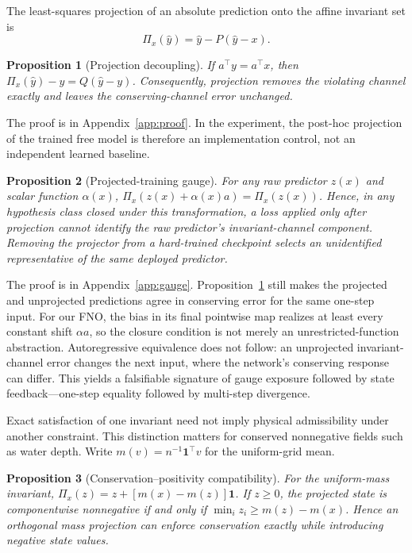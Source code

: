 \documentclass{article}
\newtheorem{proposition}{Proposition}
\begin{document}
The least-squares projection of an absolute prediction onto the affine invariant set is
\begin{equation}
  \Pi_x(\hat y)=\hat y-P(\hat y-x).
\end{equation}

\begin{proposition}[Projection decoupling]
\label{prop:decoupling}
If $a^\top y=a^\top x$, then
$\Pi_x(\hat y)-y=Q(\hat y-y)$. Consequently, projection removes the violating channel exactly and
leaves the conserving-channel error unchanged.
\end{proposition}

The proof is in Appendix~\ref{app:proof}. In the experiment, the post-hoc projection of the trained
free model is therefore an implementation control, not an independent learned baseline.

\begin{proposition}[Projected-training gauge]
\label{prop:gauge}
For any raw predictor $z(x)$ and scalar function $\alpha(x)$,
$\Pi_x(z(x)+\alpha(x)a)=\Pi_x(z(x))$. Hence, in any hypothesis class closed under this
transformation, a loss applied only after projection cannot identify the raw predictor's
invariant-channel component. Removing the projector from a hard-trained checkpoint selects an
unidentified representative of the same deployed predictor.
\end{proposition}

The proof is in Appendix~\ref{app:gauge}. Proposition~\ref{prop:decoupling} still makes the
projected and unprojected predictions agree in conserving error for the same one-step input.
For our FNO, the bias in its final pointwise map realizes at least every constant shift $\alpha a$,
so the closure condition is not merely an unrestricted-function abstraction.
Autoregressive equivalence does not follow: an unprojected invariant-channel error changes the next
input, where the network's conserving response can differ. This yields a falsifiable signature of
gauge exposure followed by state feedback---one-step equality followed by multi-step divergence.

Exact satisfaction of one invariant need not imply physical admissibility under another
constraint. This distinction matters for conserved nonnegative fields such as water depth. Write
$m(v)=n^{-1}\mathbf{1}^{\top}v$ for the uniform-grid mean.

\begin{proposition}[Conservation--positivity compatibility]
\label{prop:positivity}
For the uniform-mass invariant, $\Pi_x(z)=z+[m(x)-m(z)]\mathbf{1}$. If $z\geq0$, the projected
state is componentwise nonnegative if and only if
$\min_i z_i\geq m(z)-m(x)$. Hence an orthogonal mass projection can enforce conservation exactly
while introducing negative state values.
\end{proposition}
\end{document}
